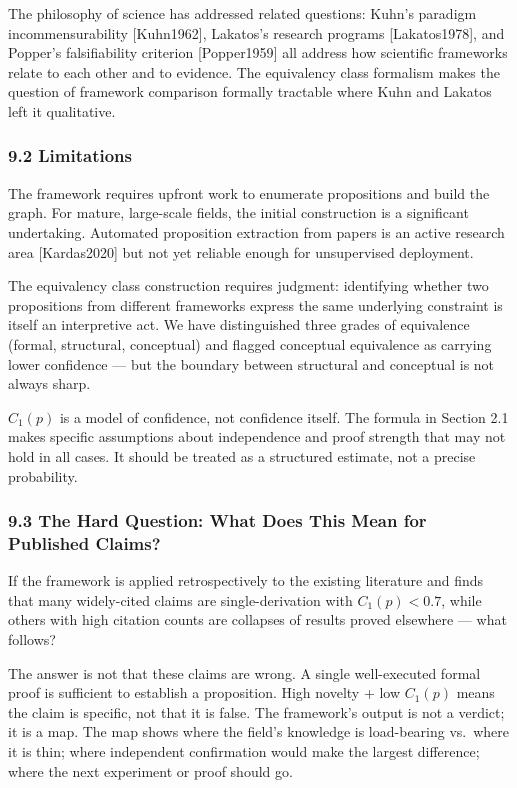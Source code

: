 \documentclass[
]{article}
\begin{document}
The philosophy of science has addressed related questions: Kuhn's
paradigm incommensurability {[}Kuhn1962{]}, Lakatos's research programs
{[}Lakatos1978{]}, and Popper's falsifiability criterion
{[}Popper1959{]} all address how scientific frameworks relate to each
other and to evidence. The equivalency class formalism makes the
question of framework comparison formally tractable where Kuhn and
Lakatos left it qualitative.

\subsubsection{9.2 Limitations}\label{limitations}

The framework requires upfront work to enumerate propositions and build
the graph. For mature, large-scale fields, the initial construction is a
significant undertaking. Automated proposition extraction from papers is
an active research area {[}Kardas2020{]} but not yet reliable enough for
unsupervised deployment.

The equivalency class construction requires judgment: identifying
whether two propositions from different frameworks express the same
underlying constraint is itself an interpretive act. We have
distinguished three grades of equivalence (formal, structural,
conceptual) and flagged conceptual equivalence as carrying lower
confidence --- but the boundary between structural and conceptual is not
always sharp.

\(C_1(p)\) is a model of confidence, not confidence itself. The formula
in Section 2.1 makes specific assumptions about independence and proof
strength that may not hold in all cases. It should be treated as a
structured estimate, not a precise probability.

\subsubsection{9.3 The Hard Question: What Does This Mean for Published
Claims?}\label{the-hard-question-what-does-this-mean-for-published-claims}

If the framework is applied retrospectively to the existing literature
and finds that many widely-cited claims are single-derivation with
\(C_1(p) < 0.7\), while others with high citation counts are collapses
of results proved elsewhere --- what follows?

The answer is not that these claims are wrong. A single well-executed
formal proof is sufficient to establish a proposition. High novelty +
low \(C_1(p)\) means the claim is specific, not that it is false. The
framework's output is not a verdict; it is a map. The map shows where
the field's knowledge is load-bearing vs.~where it is thin; where
independent confirmation would make the largest difference; where the
next experiment or proof should go.
\end{document}
